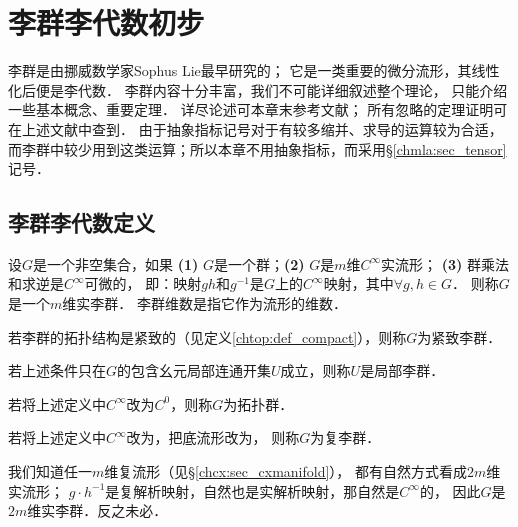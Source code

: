 
\chapter{李群李代数初步}\label{chlg}

李群是由挪威数学家Sophus Lie最早研究的；
它是一类重要的微分流形，其线性化后便是李代数．
李群内容十分丰富，我们不可能详细叙述整个理论，
只能介绍一些基本概念、重要定理．
详尽论述可本章末参考文献；
所有忽略的定理证明可在上述文献中查到．
由于抽象指标记号对于有较多缩并、求导的运算较为合适，
而李群中较少用到这类运算；所以本章不用抽象指标，而采用\S \ref{chmla:sec_tensor}记号．


\section{李群李代数定义}\label{chlg:sec_definition}

\begin{definition}\label{chlg:def_lg}
    设$G$是一个非空集合，如果
    {\bfseries (1)} $G$是一个群；{\bfseries (2)} $G$是$m$维$C^\infty$实流形；
    {\bfseries (3)} 群乘法和求逆是$C^\infty$可微的，
    即：映射$gh$和$g^{-1}$是$G$上的$C^\infty$映射，其中$\forall g,h\in G$．
    则称$G$是一个$m$维实{\heiti 李群}．
    李群{\heiti 维数}是指它作为流形的维数．

    若李群的拓扑结构是紧致的（见定义\ref{chtop:def_compact}），则称$G$为{\heiti 紧致李群}．
    
    若上述条件只在$G$的包含幺元局部连通开集$U$成立，则称$U$是{\heiti 局部李群}．
       
    若将上述定义中$C^\infty$改为$C^0$，则称$G$为{\heiti 拓扑群}．
    
    若将上述定义中$C^\infty$改为，把底流形改为，
    则称$G$为{\heiti 复李群}．
\end{definition}

我们知道任一$m$维复流形（见\S\ref{chcx:sec_cxmanifold}），
都有自然方式看成$2m$维实流形；
$g\cdot h^{-1}$是复解析映射，自然也是实解析映射，那自然是$C^\infty$的，
因此$G$是$2m$维实李群．反之未必．


